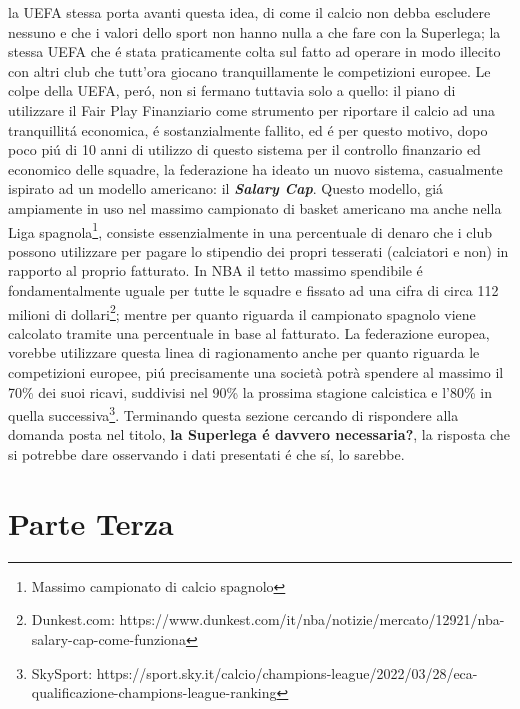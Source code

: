 \documentclass[
    corpo=12pt,
    oneside,
    evenboxes,
    tipotesi=triennale,
    stile=classica,
    oldstyle,
    autoretitolo,
    greek,
]{toptesi}
\begin{document}
\begin{interlinea}{1.5}
la UEFA stessa porta avanti questa idea, di come il calcio non debba escludere nessuno e che i valori dello sport non hanno nulla a che fare con la 
Superlega; la stessa UEFA che \'e stata praticamente colta sul fatto ad operare in modo illecito con altri club che tutt'ora giocano tranquillamente
le competizioni europee. Le colpe della UEFA, per\'o, non si fermano tuttavia solo a quello: il piano di utilizzare il Fair Play Finanziario come 
strumento per riportare il calcio ad una tranquillit\'a economica, \'e sostanzialmente fallito, ed \'e per questo motivo, dopo poco pi\'u di 
10 anni di utilizzo di questo sistema per il controllo finanzario ed economico delle squadre, la federazione ha ideato un nuovo sistema, 
casualmente ispirato ad un modello americano: il \textbf{\emph{Salary Cap}}. Questo modello, gi\'a ampiamente in uso nel massimo campionato di 
basket americano ma anche nella Liga spagnola\footnote{Massimo campionato di calcio spagnolo}, consiste essenzialmente in una percentuale di denaro che i
club possono utilizzare per pagare lo stipendio dei propri tesserati (calciatori e non) in rapporto al proprio fatturato. In NBA il tetto 
massimo spendibile \'e fondamentalmente uguale per tutte le squadre e fissato ad una cifra di circa 112 milioni di dollari\footnote{Dunkest.com: https://www.dunkest.com/it/nba/notizie/mercato/12921/nba-salary-cap-come-funziona};
mentre per quanto riguarda il campionato spagnolo viene calcolato tramite una percentuale in base al fatturato. La federazione europea, vorebbe 
utilizzare questa linea di ragionamento anche per quanto riguarda le \linebreak competizioni europee, pi\'u precisamente una società potrà spendere al massimo il 70\% dei suoi ricavi, 
suddivisi nel 90\% la prossima stagione calcistica e l'80\% in quella successiva\footnote{SkySport: https://sport.sky.it/calcio/champions-league/2022/03/28/eca-qualificazione-champions-league-ranking}.\newline
Terminando questa sezione cercando di rispondere alla domanda posta nel titolo, \textbf{la Superlega \'e davvero necessaria?}, la risposta che si potrebbe
dare osservando i dati presentati \'e che s\'i, lo sarebbe. 
\part{Parte Terza}

\end{interlinea}
\end{document}
